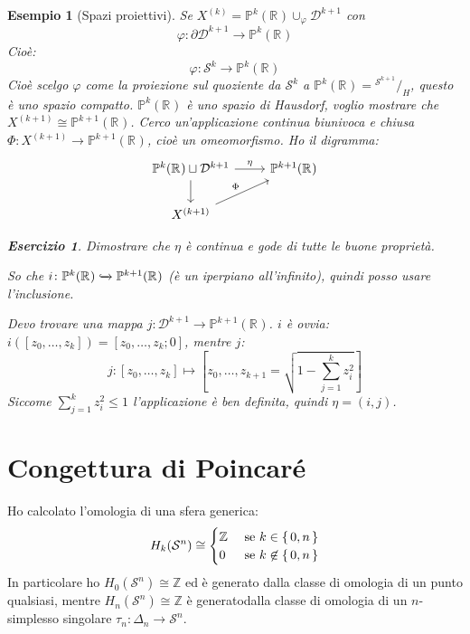 \documentclass[10pt, twoside=false, x11names]{scrbook}
\newtheorem{example}[theorem]{Esempio}
\newcounter{exercises}
\newtheorem{exercise}[exercises]{Esercizio}
\newcommand{\Z}{\mathbb{Z}}
\renewcommand{\phi}{\varphi}
\newcommand{\RN}[1][]{\mathbb{R}^#1}
\newcommand{\Sph}[1][]{\mathcal{S}^#1}
\newcommand{\Disk}[1][]{\mathcal{D}^#1}
\newcommand{\incl}{\xhookrightarrow{}}
\newcommand*\quot[2]{{^{\textstyle #1}\big/_{\textstyle #2}}}
\begin{document}
\begin{example}[Spazi proiettivi]
  Se $ X^{(k)} = \mathbb{P}^k(\RN{}) \cup_\phi \Disk{k+1} $ con
  \[
    \phi \colon \partial \Disk{k+1}  \to \mathbb{P}^k(\RN{})
  \]
  Cioè:
  \[
    \phi \colon \Sph{k}  \to \mathbb{P}^k(\RN{})
  \]
  Cioè scelgo $ \phi $ come la proiezione sul quoziente da $ \Sph{k} $ a $ \mathbb{P}^k(\RN{}) = \quot{\Sph{k+1}}{H} $,
  questo è uno spazio compatto.
  $ \mathbb{P}^k(\RN{}) $ è uno spazio di Hausdorf, voglio mostrare che $ X^{(k+1)} \cong \mathbb{P}^{k+1}(\RN{}) $.
  Cerco un'applicazione continua biunivoca e chiusa $ \Phi \colon X^{(k+1)} \to  \mathbb{P}^{k+1}(\RN{}) $,
  cioè un omeomorfismo. Ho il digramma:
  \[
    \begin{tikzcd}
      \mathbb{P}^{k}(\RN{}) \sqcup \Disk{k+1} \arrow{r}{\eta} \arrow{d}{} &  \mathbb{P}^{k+1}(\RN{}) \\
      X^{(k+1)} \arrow{ru}{\Phi}
    \end{tikzcd}
  \]
  \begin{exercise}
    Dimostrare che $ \eta $ è continua e gode di tutte le buone proprietà.
  \end{exercise}
  So che $ i \colon  \mathbb{P}^{k}(\RN{}) \incl \mathbb{P}^{k+1}(\RN{}) $ (è un iperpiano all'infinito),
  quindi posso usare l'inclusione.

  Devo trovare una mappa $ j \colon \Disk{k+1} \to \mathbb{P}^{k+1}(\RN{}) $. $ i $ è ovvia:
  $ i([z_0, \dots, z_k]) = [z_0, \dots, z_k; 0] $, mentre $ j $:
  \[
    j \colon [z_0, \dots, z_k] \mapsto  \left[z_0, \dots, z_{k+1} = \sqrt{1 - \sum_{j=1}^k z_i^2}\right]
  \]
  Siccome $ \sum_{j=1}^k z_i^2 \leq 1 $ l'applicazione è ben definita, quindi $ \eta = (i,j) $.
\end{example}





\section{Congettura di Poincaré}

Ho calcolato l'omologia di una sfera generica:
\[
  H_k(\Sph{n}) \cong
  \begin{cases}
    \Z & \text{ se } k \in \set{0,n} \\
    0 & \text{ se } k \not \in \set{0,n}
  \end{cases}
\]
In particolare ho $ H_0(\Sph{n}) \cong \Z $ ed è generato dalla classe di
omologia di un punto qualsiasi, mentre $ H_n(\Sph{n}) \cong \Z $ è generatodalla
classe di omologia di un $ n $-simplesso singolare $ \tau_n \colon \Delta_n \to \Sph{n} $.
\end{document}
